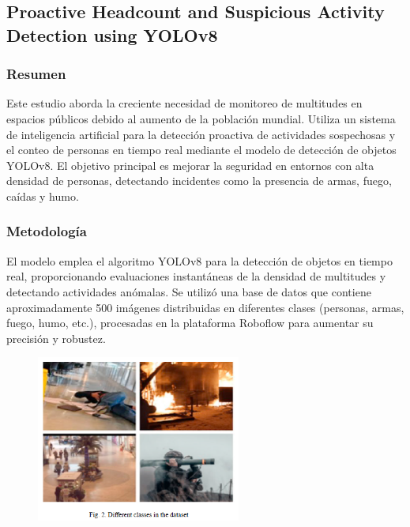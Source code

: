 \subsection{Proactive Headcount and Suspicious Activity Detection using YOLOv8}

\subsubsection{Resumen}
Este estudio aborda la creciente necesidad de monitoreo de multitudes en espacios públicos debido al aumento de la población mundial. Utiliza un sistema de inteligencia artificial para la detección proactiva de actividades sospechosas y el conteo de personas en tiempo real mediante el modelo de detección de objetos YOLOv8. El objetivo principal es mejorar la seguridad en entornos con alta densidad de personas, detectando incidentes como la presencia de armas, fuego, caídas y humo.

\subsubsection{Metodología}
El modelo emplea el algoritmo YOLOv8 para la detección de objetos en tiempo real, proporcionando evaluaciones instantáneas de la densidad de multitudes y detectando actividades anómalas. Se utilizó una base de datos que contiene aproximadamente 500 imágenes distribuidas en diferentes clases (personas, armas, fuego, humo, etc.), procesadas en la plataforma Roboflow para aumentar su precisión y robustez.

\begin{figure}[h] %
    \centering
    \includegraphics[width=0.6\textwidth]{4/met1.png} %
    \label{fig:ejemplo} %
\end{figure}

